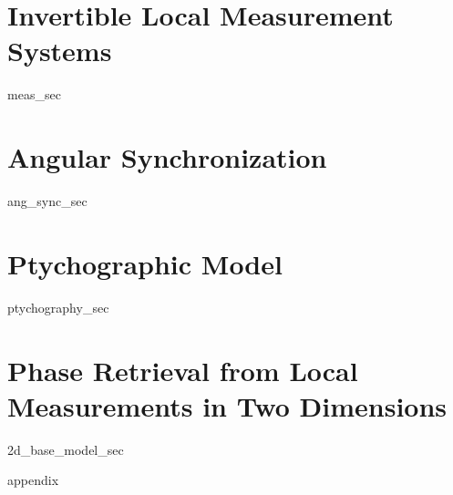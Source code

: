 \documentclass[12pt]{ucsd-thesis-2018}
\begin{document}
\chapter{Invertible Local Measurement Systems}
{meas_sec}

\chapter{Angular Synchronization}
{ang_sync_sec}

\chapter{Ptychographic Model}
{ptychography_sec}

\chapter{Phase Retrieval from Local Measurements in Two Dimensions}
{2d_base_model_sec}



\appendix
{appendix}

{
}
\end{document}
